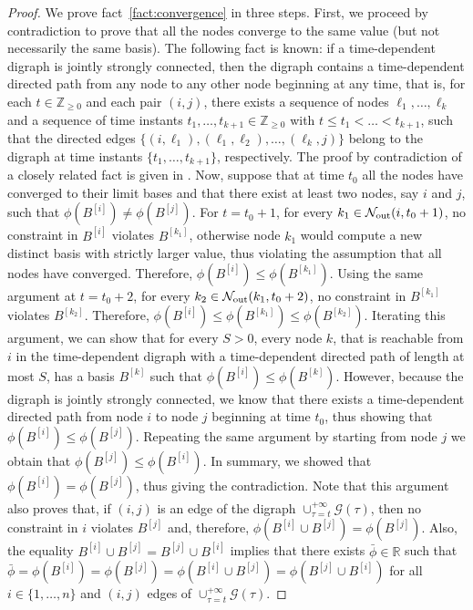 \documentclass[onecolumn,journal,letterpaper]{IEEEtran}
\newcommand{\integernonnegative}{{\mathbb{Z}_{\geq0}}}
\newcommand{\naturalzero}{\mathbb{N}_0}
\renewcommand{\naturalzero}{\integernonnegative}
\newcommand{\real}{{\mathbb{R}}}
\newcommand{\subscr}[2]{{#1}_{\textup{#2}}}
\newcommand{\union}{\cup}
\newcommand{\GG}{\mathcal{G}}
\newcommand{\until}[1]{\{1,\dots,#1\}}
\newcommand{\outnbrs}{\subscr{\mathcal{N}}{out}}
\newcommand{\supind}[2]{{#1}^{[#2]}}
\begin{document}
\begin{proof}
   We prove fact~\ref{fact:convergence} in three steps.  First, we proceed
   by contradiction to prove that all the nodes converge to the same value
   (but not necessarily the same basis). The following fact is known: if a
   time-dependent digraph is jointly strongly connected, then the digraph
   contains a time-dependent directed path from any node to any other node
   beginning at any time, that is, for each $t \in \naturalzero$ and each
   pair $(i,j)$, there exists a sequence of nodes $\ell_1,\dots,\ell_k$ and
   a sequence of time instants $t_1, \dots, t_{k+1}\in \naturalzero$ with
   $t \leq t_1 < \dots < t_{k+1}$, such that the directed edges
   $\{(i,\ell_1),(\ell_1,\ell_2), \dots, (\ell_k,j)\}$ belong to the digraph
   at time instants $\{t_1,\dots,t_{k+1}\}$, respectively.  The proof by
   contradiction of a closely related fact is given in
   \cite[Theorem~9.3]{JMH:08}.  Now, suppose that at time $t_0$ all the
   nodes have converged to their limit bases and that there exist at least
   two nodes, say $i$ and $j$, such that $\phi(\supind{B}{i}) \neq
   \phi(\supind{B}{j})$. For $t = t_0 + 1$, for every $k_1 \in
   \outnbrs(i,t_0+1)$, no constraint in $\supind{B}{i}$ violates
   $\supind{B}{k_1}$, otherwise node $k_1$ would compute a new distinct
   basis with strictly larger value, thus violating the assumption that all
   nodes have converged. Therefore, $\phi(\supind{B}{i}) \leq
   \phi(\supind{B}{k_1})$.  Using the same argument at $t = t_0 + 2$, for
   every $k_2 \in \outnbrs(k_1,t_0+2)$, no constraint in $\supind{B}{k_1}$
   violates $\supind{B}{k_2}$.  Therefore, $\phi(\supind{B}{i}) \leq
   \phi(\supind{B}{k_1}) \leq \phi(\supind{B}{k_2})$.  Iterating this
   argument, we can show that for every $S>0$, every node $k$, that is
   reachable from $i$ in the time-dependent digraph with a time-dependent
   directed path of length at most $S$, has a basis $\supind{B}{k}$ such
   that $\phi(\supind{B}{i}) \leq \phi(\supind{B}{k})$.  However, because
   the digraph is jointly strongly connected, we know that there exists a
   time-dependent directed path from node $i$ to node $j$ beginning at time
   $t_0$, thus showing that $\phi(\supind{B}{i}) \leq \phi(\supind{B}{j})$.
   Repeating the same argument by starting from node $j$ we obtain that
   $\phi(\supind{B}{j}) \leq \phi(\supind{B}{i})$. In summary, we showed
   that $\phi(\supind{B}{i}) = \phi(\supind{B}{j})$, thus giving the
   contradiction.  Note that this argument also proves that, if $(i,j)$ is
   an edge of the digraph $\union_{\tau=t}^{+\infty} \GG(\tau)$, then no
   constraint in $i$ violates $\supind{B}{j}$ and, therefore,
   $\phi(\supind{B}{i}\union\supind{B}{j})=\phi(\supind{B}{j})$.  Also, the
   equality
   $\supind{B}{i}\union\supind{B}{j}=\supind{B}{j}\union\supind{B}{i}$
   implies that there exists $\bar{\phi}\in\real$ such that $\bar{\phi}
   =\phi(\supind{B}{i}) =\phi(\supind{B}{j})
   =\phi(\supind{B}{i}\union\supind{B}{j})
   =\phi(\supind{B}{j}\union\supind{B}{i})$ for all $i\in\until{n}$ and
   $(i,j)$ edges of $\union_{\tau=t}^{+\infty} \GG(\tau)$.


\end{proof}
\end{document}
